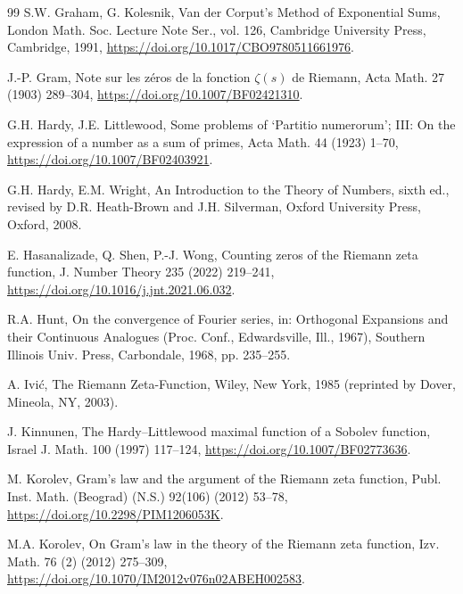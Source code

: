 \documentclass[preprint,12pt]{elsarticle}
\numberwithin{equation}{section}
\theoremstyle{plain}
\theoremstyle{definition}
\theoremstyle{remark}
\begin{document}
\begin{thebibliography}{99}
S.W. Graham, G. Kolesnik, Van der Corput's Method of Exponential Sums, London Math. Soc. Lecture Note Ser., vol. 126, Cambridge University Press, Cambridge, 1991, \href{https://doi.org/10.1017/CBO9780511661976}{https://doi.org/10.1017/CBO9780511661976}.

J.-P. Gram, Note sur les z\'eros de la fonction $\zeta(s)$ de Riemann, Acta Math. 27 (1903) 289--304, \href{https://doi.org/10.1007/BF02421310}{https://doi.org/10.1007/BF02421310}.%

G.H. Hardy, J.E. Littlewood, Some problems of `Partitio numerorum'; III: On the expression of a number as a sum of primes, Acta Math. 44 (1923) 1--70, \href{https://doi.org/10.1007/BF02403921}{https://doi.org/10.1007/BF02403921}.

G.H. Hardy, E.M. Wright, An Introduction to the Theory of Numbers, sixth ed., revised by D.R. Heath-Brown and J.H. Silverman, Oxford University Press, Oxford, 2008.

E. Hasanalizade, Q. Shen, P.-J. Wong, Counting zeros of the Riemann zeta function, J. Number Theory 235 (2022) 219--241, \href{https://doi.org/10.1016/j.jnt.2021.06.032}{https://doi.org/10.1016/j.jnt.2021.06.032}.

R.A. Hunt, On the convergence of Fourier series, in: Orthogonal Expansions and their Continuous Analogues (Proc. Conf., Edwardsville, Ill., 1967), Southern Illinois Univ. Press, Carbondale, 1968, pp. 235--255.

A. Ivi\'c, The Riemann Zeta-Function, Wiley, New York, 1985 (reprinted by Dover, Mineola, NY, 2003).

J. Kinnunen, The Hardy--Littlewood maximal function of a Sobolev function, Israel J. Math. 100 (1997) 117--124, \href{https://doi.org/10.1007/BF02773636}{https://doi.org/10.1007/BF02773636}.

M. Korolev, Gram's law and the argument of the Riemann zeta function, Publ. Inst. Math. (Beograd) (N.S.) 92(106) (2012) 53--78, \href{https://doi.org/10.2298/PIM1206053K}{https://doi.org/10.2298/PIM1206053K}.

M.A. Korolev, On Gram's law in the theory of the Riemann zeta function, Izv. Math. 76 (2) (2012) 275--309, \href{https://doi.org/10.1070/IM2012v076n02ABEH002583}{https://doi.org/10.1070/IM2012v076n02ABEH002583}.


\end{thebibliography}
\end{document}
